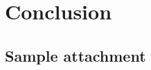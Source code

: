 \documentclass[ieee]{tauthesis}
\begin{document}
\chapter{Conclusion}
\label{ch:conclusion}



\ifdraftmode\else

    \printbibliography[heading=bibintoc]
\fi


\begin{appendices}

    \chapter{Sample attachment}
    \label{ch:appendix}
    

\end{appendices}
\end{document}

